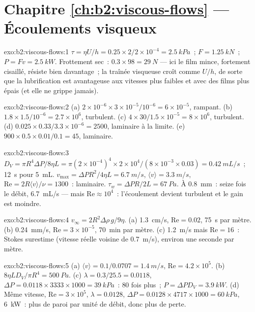 \section*{Chapitre \ref{ch:b2:viscous-flows} --- Écoulements visqueux}

\begin{solution}{exo:b2:viscous-flows:1}
$\tau = \eta U/h = 0.25 \times 2/2 \times 10^{-4} = \qty{2.5}{kPa}$~; $F = \qty{1.25}{kN}$~;
$P = Fv = \qty{2.5}{kW}$. Frottement sec~: $0.3 \times 98 = \qty{29}{N}$ --- ici le
film mince, fortement cisaillé, résiste bien davantage~; la traînée visqueuse croît comme
$U/h$, de sorte que la lubrification est avantageuse aux vitesses plus faibles et avec des films plus épais (et
elle ne grippe jamais).
\end{solution}

\begin{solution}{exo:b2:viscous-flows:2}
(a) $2 \times 10^{-6} \times 3 \times 10^{-5}/10^{-6} = 6 \times 10^{-5}$, rampant. (b)
$1.8 \times 1.5/10^{-6} = 2.7 \times 10^6$, turbulent. (c) $4 \times 30/1.5 \times 10^{-5}
= 8 \times 10^6$, turbulent. (d) $0.025 \times 0.33/3.3 \times 10^{-6} = 2500$,
laminaire à la limite. (e) $900 \times 0.5 \times 0.01/0.1 = 45$, laminaire.
\end{solution}

\begin{solution}{exo:b2:viscous-flows:3}
$D_V = \pi R^4\Delta P/8\eta L = \pi(2 \times 10^{-4})^4 \times 2 \times 10^4/(8 \times 10^{-3}
\times 0.03) = \qty{0.42}{mL/s}$~; \qty{12}{s} pour \qty{5}{mL}. $v_{\max} = \Delta PR^2/
4\eta L = \qty{6.7}{m/s}$, $\langle v\rangle = \qty{3.3}{m/s}$, $\mathrm{Re} = 2R\langle v
\rangle/\nu = 1300$~: laminaire. $\tau_w = \Delta PR/2L = \qty{67}{Pa}$. À \qty{0.8}{mm}~:
seize fois le débit, \qty{6.7}{mL/s} --- mais $\mathrm{Re} \approx 10^4$~: l'écoulement
devient turbulent et le gain est moindre.
\end{solution}

\begin{solution}{exo:b2:viscous-flows:4}
$v_\infty = 2R^2\Delta\rho\,g/9\eta$. (a) \qty{1.3}{cm/s}, $\mathrm{Re} = 0.02$, \qty{75}{s}
par mètre. (b) \qty{0.24}{mm/s}, $\mathrm{Re} = 3 \times 10^{-5}$, \qty{70}{min} par
mètre. (c) \qty{1.2}{m/s} mais $\mathrm{Re} = 16$~: Stokes surestime (vitesse
réelle voisine de \qty{0.7}{m/s}), environ une seconde par mètre.
\end{solution}

\begin{solution}{exo:b2:viscous-flows:5}
(a) $\langle v\rangle = 0.1/0.0707 = \qty{1.4}{m/s}$, $\mathrm{Re} = 4.2 \times 10^5$. (b)
$8\eta LD_V/\pi R^4 = \qty{500}{Pa}$. (c) $\lambda = 0.3/25.5 = 0.0118$, $\Delta P = 0.0118
\times 3333 \times 1000 = \qty{39}{kPa}$~: $80$ fois plus~; $P = \Delta PD_V = \qty{3.9}{kW}$.
(d) Même vitesse, $\mathrm{Re} = 3 \times 10^5$, $\lambda = 0.0128$, $\Delta P = 0.0128 \times 4717
\times 1000 = \qty{60}{kPa}$, \qty{6}{kW}~: plus de paroi par unité de débit, donc plus de perte.
\end{solution}

